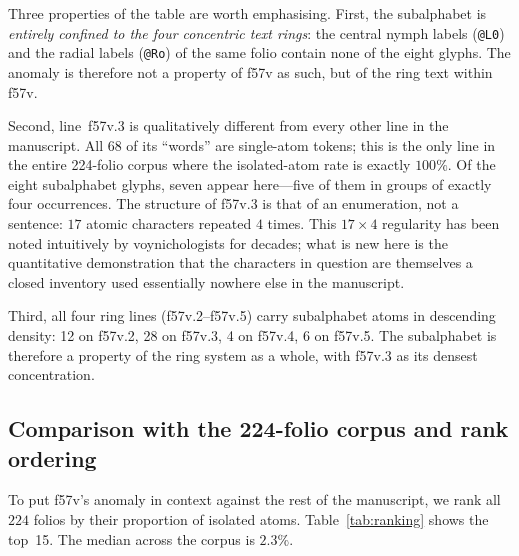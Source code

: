 Three properties of the table are worth emphasising. First, the subalphabet
is \emph{entirely confined to the four concentric text rings}: the central
nymph labels (\texttt{@L0}) and the radial labels (\texttt{@Ro}) of the same
folio contain none of the eight glyphs. The anomaly is therefore not a
property of f57v as such, but of the ring text within f57v.

Second, line~f57v.3 is qualitatively different from every other line in the
manuscript. All $68$ of its ``words'' are single-atom tokens; this is the
only line in the entire 224-folio corpus where the isolated-atom rate is
exactly $100\%$. Of the eight subalphabet glyphs, seven appear here---five of
them in groups of exactly four occurrences. The structure of f57v.3 is that
of an enumeration, not a sentence: $17$ atomic characters repeated $4$ times.
This $17\!\times\!4$ regularity has been noted intuitively by voynichologists
for decades; what is new here is the quantitative demonstration that the
characters in question are themselves a closed inventory used essentially
nowhere else in the manuscript.

Third, all four ring lines (f57v.2--f57v.5) carry subalphabet atoms in
descending density: 12 on f57v.2, 28 on f57v.3, 4 on f57v.4, 6 on f57v.5.
The subalphabet is therefore a property of the ring system as a whole, with
f57v.3 as its densest concentration.

\subsection{Comparison with the 224-folio corpus and rank ordering}
\label{sec:ranking}

To put f57v's anomaly in context against the rest of the manuscript, we rank
all $224$ folios by their proportion of isolated atoms. Table~\ref{tab:ranking}
shows the top~15. The median across the corpus is $2.3\%$.

